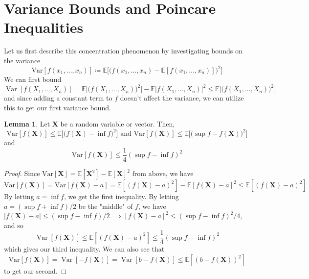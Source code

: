 \documentclass{article}
\DeclareMathOperator{\Var}{Var}
\theoremstyle{definition}
\newtheorem{lemma}[theorem]{Lemma}
\theoremstyle{remark}
\theoremstyle{definition}
\begin{document}
\pagebreak 

\section{Variance Bounds and Poincare Inequalities}

Let us first describe this concentration phenomenon by investigating bounds on the variance 
\[\mathrm{Var}[f(x_1, \ldots, x_n)] \coloneqq \mathbb{E}\big[ \big( f(x_1, \ldots, x_n) - \mathbb{E}[f(x_1, \ldots, x_n)] \big)^2 \big] \]
We can first bound 
\[\Var[f(X_1, \ldots, X_n)] = \mathbb{E}\big[ \big( f(X_1, \ldots, X_n)\big)^2 \big] - \mathbb{E}\big[ f(X_1, \ldots, X_n) \big]^2 \leq \mathbb{E}\big[ \big( f(X_1, \ldots, X_n)\big)^2 \big]\]
and since adding a constant term to $f$ doesn't affect the variance, we can utilize this to get our first variance bound. 

\begin{lemma}
Let $\mathbf{X}$ be a random variable or vector. Then, 
\[\mathrm{Var}[f(\mathbf{X})] \leq \mathbb{E} \big[ \big( f(\mathbf{X}) - \inf f \big)^2 \big] \text{ and } \mathrm{Var}[f(\mathbf{X})] \leq \mathbb{E} \big[ \big(\sup f - f(\mathbf{X}) \big)^2 \big]\]
and 
\[\mathrm{Var}[ f(\mathbf{X})] \leq \frac{1}{4} ( \sup f - \inf f)^2\]
\end{lemma}
\begin{proof} 
Since $\mathrm{Var}[\mathbf{X}] = \mathbb{E}[\mathbf{X}^2] - \mathbb{E}[\mathbf{X}]^2$ from above, we have 
\[\mathrm{Var}[ f(\mathbf{X})] = \mathrm{Var}[f(\mathbf{X}) - a] = \mathbb{E}[(f(\mathbf{X}) - a)^2] - \mathbb{E}[f(\mathbf{X}) - a]^2 \leq \mathbb{E}[(f(\mathbf{X}) - a)^2]\]
By letting $a = \inf f$, we get the first inequality. By letting $a = (\sup f + \inf f) /2$ be the "middle" of $f$, we have $|f(\mathbf{X}) - a| \leq (\sup f - \inf f)/2 \implies [f(\mathbf{X}) - a]^2 \leq (\sup f - \inf f)^2/4$, and so 
\[\Var[ f(\mathbf{X})] \leq \mathbb{E}[(f(\mathbf{X}) - a)^2] \leq \frac{1}{4} (\sup f - \inf f)^2\]
which gives our third inequality. We can also see that 
\[\mathrm{Var}[ f(\mathbf{X})] = \Var[ -f (\mathbf{X})] = \Var[ b - f(\mathbf{X})] \leq \mathbb{E}[ (b - f(\mathbf{X}))^2]\]
to get our second. 
\end{proof} 
\end{document}

